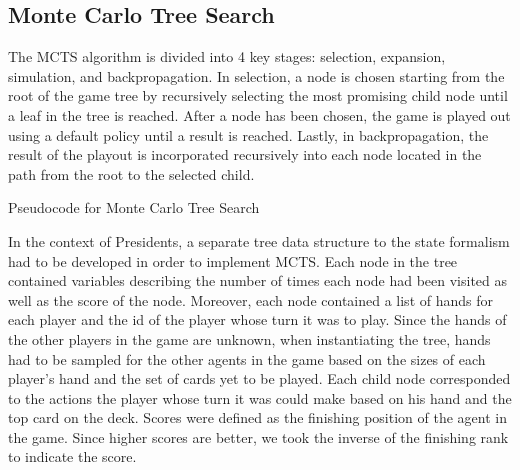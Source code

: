 \documentclass[11pt]{article}
\begin{document}
\subsection{Monte Carlo Tree Search}

The MCTS algorithm is divided into 4 key stages: selection, expansion, simulation, and backpropagation. In selection, a node is chosen starting from the root of the game tree by recursively selecting the most promising child node until a leaf in the tree is reached. After a node has been chosen, the game is played out using a default policy until a result is reached. Lastly, in backpropagation, the result of the playout is incorporated recursively into each node located in the path from the root to the selected child.\\

\begin{algorithm}
  \begin{algorithmic}
	\EndWhile{}
  \end{algorithmic}
  \caption{Pseudocode for Monte Carlo Tree Search}
\end{algorithm}

In the context of Presidents, a separate tree data structure to the state formalism had to be developed in order to implement MCTS. Each node in the tree contained variables describing the number of times each node had been visited as well as the score of the node. Moreover, each node contained a list of hands for each player and the id of the player whose turn it was to play. Since the hands of the other players in the game are unknown, when instantiating the tree, hands had to be sampled for the other agents in the game based on the sizes of each player's hand and the set of cards yet to be played. Each child node corresponded to the actions the player whose turn it was could make based on his hand and the top card on the deck. Scores were defined as the finishing position of the agent in the game. Since higher scores are better, we took the inverse of the finishing rank to indicate the score. \\
\end{document}
